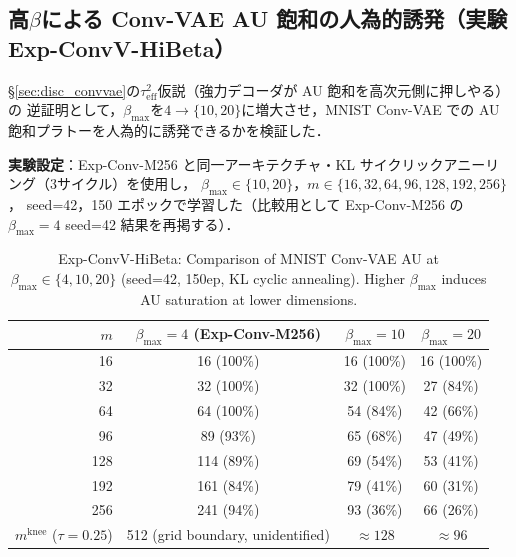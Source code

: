 \documentclass[11pt,a4paper]{jsarticle}
\newcommand{\mknee}{m^{\mathrm{knee}}}
\begin{document}
\subsection{高$\beta$による Conv-VAE AU 飽和の人為的誘発（実験 Exp-ConvV-HiBeta）}\label{sec:exp_hibeta}

§\ref{sec:disc_convvae}の$\tau^2_\mathrm{eff}$仮説（強力デコーダが AU 飽和を高次元側に押しやる）の
逆証明として，$\beta_{\max}$を$4 \to \{10, 20\}$に増大させ，MNIST Conv-VAE での
AU 飽和プラトーを人為的に誘発できるかを検証した．

\textbf{実験設定}：Exp-Conv-M256 と同一アーキテクチャ・KL サイクリックアニーリング（3サイクル）を使用し，
$\beta_{\max} \in \{10, 20\}$，$m \in \{16, 32, 64, 96, 128, 192, 256\}$，
seed=42，150 エポックで学習した（比較用として Exp-Conv-M256 の$\beta_{\max}=4$ seed=42 結果を再掲する）．

\begin{table}[H]
\centering
\caption{Exp-ConvV-HiBeta: Comparison of MNIST Conv-VAE AU at $\beta_\mathrm{max} \in \{4, 10, 20\}$ (seed=42, 150ep, KL cyclic annealing). Higher $\beta_\mathrm{max}$ induces AU saturation at lower dimensions.}
\label{tab:hibeta}
\small
\begin{tabular}{r ccc}
\toprule
$m$ & $\beta_{\max}=4$ (Exp-Conv-M256) & $\beta_{\max}=10$ & $\beta_{\max}=20$ \\
\midrule
 16  & 16  (100\%)& 16 (100\%) & 16 (100\%) \\
 32  & 32  (100\%)& 32 (100\%) & 27 (84\%)  \\
 64  & 64  (100\%)& 54 (84\%)  & 42 (66\%)  \\
 96  & 89  (93\%) & 65 (68\%)  & 47 (49\%)  \\
128  & 114 (89\%) & 69 (54\%)  & 53 (41\%)  \\
192  & 161 (84\%) & 79 (41\%)  & 60 (31\%)  \\
256  & 241 (94\%) & 93 (36\%)  & 66 (26\%)  \\
\midrule
$\mknee$ ($\tau=0.25$) & 512 (grid boundary, unidentified) & $\approx 128$ & $\approx 96$ \\
\bottomrule
\end{tabular}
\end{table}
\end{document}
